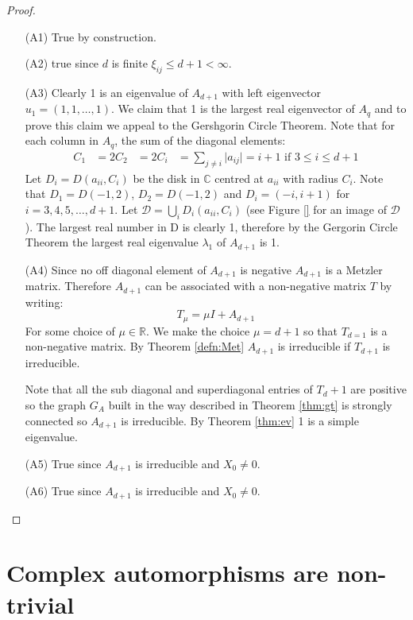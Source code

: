 \documentclass[oneside]{book} %
\theoremstyle{definition}
\numberwithin{equation}{section}
\begin{document}
\begin{proof}
\begin{itemize}
 \item[(A1)]  True by construction.
 
 \item[(A2)]  true since $d$ is finite $\xi_{ij} \leq d+1 < \infty$.
 
 \item[(A3)] Clearly 1 is an eigenvalue of $A_{d+1}$ with left eigenvector $u_1 = (1,1,\dots,1)$.  We claim that 1 is the largest real eigenvector of $A_q$ and to prove this claim we appeal to the Gershgorin Circle Theorem.  Note that for each column in $A_q$, the sum of the diagonal elements:
\begin{align*}
 C_1 &= 2
 C_2 &= 2
 C_i &= \sum_{j \neq i} \lvert a_{ij} \rvert = i+1  \text{      if     }  3\leq i \leq d+1 
\end{align*}
 Let $D_i = D(a_{ii}, C_i)$ be the disk in $\mathbb{C}$ centred at $a_{ii}$ with radius $C_i$.  Note that $D_1 = D(-1,2)$, $D_2 = D(-1,2)$  and  $D_i = (-i,i+1)$ for $i = 3,4,5,\dots, d+1$. Let $\mathcal{D} = \bigcup_i D_i(a_{ii},C_i)$ (see Figure \ref{} for an image of $\mathcal{D}$).  The largest real number in  D is clearly 1, therefore by the Gergorin Circle Theorem the largest real eigenvalue $\lambda_1$ of $A_{d+1}$ is 1.    
 
 \item[(A4)]  Since no off diagonal element of $A_{d+1}$ is negative $A_{d+1}$ is a Metzler matrix.  Therefore $A_{d+1}$ can be associated with a non-negative matrix $T$ by writing:
\[T_\mu = \mu I + A_{d+1}\]
For some choice of $\mu \in \mathbb{R}$.  We make the choice $\mu = d+1$ so that $T_{d=1}$ is a non-negative matrix.  By Theorem \ref{defn:Met} $A_{d+1}$ is irreducible if $T_{d+1}$ is irreducible.  

Note that all the sub diagonal and superdiagonal entries of $T_d+1$ are positive so the graph $G_A$ built in the way described in Theorem \ref{thm:gt} is strongly connected so $A_{d+1}$ is irreducible.  By Theorem \ref{thm:ev} 1 is a simple eigenvalue.  
 \item[(A5)] True since $A_{d+1}$ is irreducible and $X_{0} \neq 0$.
 \item[(A6)] True since $A_{d+1}$ is irreducible and $X_{0} \neq 0$.
\end{itemize}
\end{proof}          


 \section{Complex automorphisms are non-trivial}\label{sec:caan}
 
\end{document}

